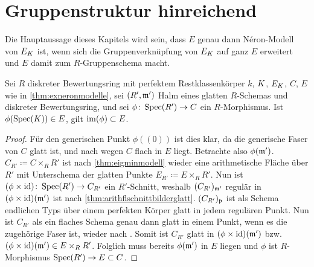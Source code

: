 \documentclass[german, bibliography=totoc]{scrreprt}
\begin{document}

  
\section{Gruppenstruktur hinreichend}\label{chap:gruppenstrukturhinreichend}
Die Hauptaussage dieses Kapitels wird sein, dass $E$ genau dann
Néron-Modell von $E_{K}$ ist, wenn sich die Gruppenverknüpfung von
$E_{K}$ auf ganz $E$ erweitert und $E$ damit zum $R$-Gruppenschema
macht.
\begin{Lemma}\label{thm:schnittearithmflglatt}
  Sei $R$ diskreter Bewertungsring mit perfektem Restklassenkörper
  $k$, $K$, $E_{K}$, $C$, $E$ wie in \ref{thm:exneronmodelle},
  sei $(R',\mathfrak{m}')$ Halm eines glatten $R$-Schemas und diskreter
  Bewertungsring,
  und sei $\phi\colon \operatorname{Spec}(R')\to C$ ein $R$-Morphismus.
  Ist $\phi(\operatorname{Spec}(K))\in E$, gilt $\operatorname{im}(\phi)\subset E$.
  \begin{proof}
    Für den generischen Punkt $\phi((0))$ ist dies klar, da die
    generische Faser von $C$ glatt ist, und nach
    \cite[8.5, Proposition 17]{bosch} wegen $C$ flach in $E$ liegt.
    Betrachte also $\phi(\mathfrak{m}')$.
    $C_{R'}\coloneqq C\times_R R'$ ist nach
    \ref{thm:eigminmodell} wieder eine arithmetische Fläche über
    $R'$ mit Unterschema der glatten Punkte
    $E_{R'}\coloneqq E\times_R R'$.
    Nun ist $(\phi\times\mathrm{id})\colon\operatorname{Spec}(R')\to C_{R'}$ ein
    $R'$-Schnitt, weshalb $(C_{R'})_{\mathfrak{m}'}$ regulär in
    $(\phi\times\mathrm{id})(\mathfrak{m}')$ ist nach
    \ref{thm:arithflschnittbilderglatt}.
    $(C_{R'})_{\mathfrak{p}}$ ist als Schema endlichen Typs über einem
    perfekten Körper glatt in jedem regulären Punkt.
    Nun ist $C_{R'}$ als ein flaches Schema genau dann glatt in
    einem Punkt, wenn es die zugehörige Faser ist, wieder nach
    \cite[8.5, Proposition 17]{bosch}.
    Somit ist $C_{R'}$ glatt in $(\phi\times\mathrm{id})(\mathfrak{m}')$ bzw.
    $(\phi\times\mathrm{id})(\mathfrak{m}')\in E\times_R R'$. Folglich muss bereits
    $\phi(\mathfrak{m}')$ in $E$ liegen und $\phi$ ist $R$-Morphismus
    $\operatorname{Spec}(R')\to E\subset C$.
  \end{proof}
\end{Lemma}  
\end{document}
